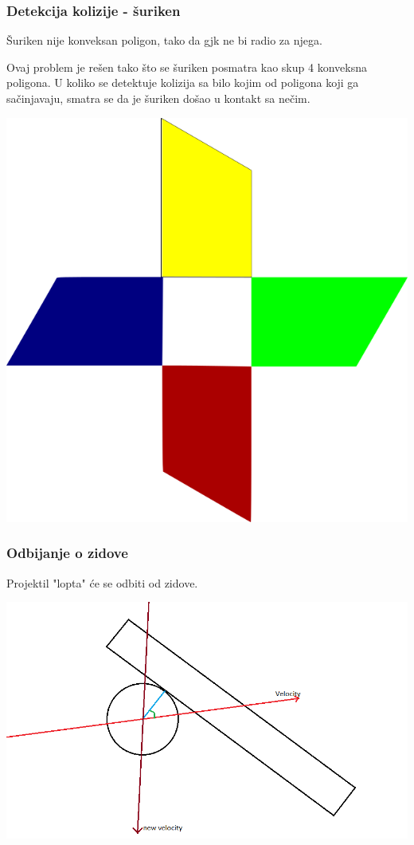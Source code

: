 \documentclass{beamer}
\begin{document}
\begin{frame}
	\frametitle{Detekcija kolizije - šuriken}
	Šuriken nije konveksan poligon, tako da gjk ne bi radio za njega.

	Ovaj problem je rešen tako što se šuriken posmatra kao skup 4 konveksna poligona. U koliko se detektuje kolizija sa bilo kojim od poligona koji ga sačinjavaju, smatra se da je šuriken došao u kontakt sa nečim.
	
	\vspace{0.4cm}
	\begin{center}
		\includegraphics[scale=0.3]{./images/shuriken.png}
	\end{center}
\end{frame}

\begin{frame}
	\frametitle{Odbijanje o zidove}
	Projektil "lopta" će se odbiti od zidove.
	
	\includegraphics[scale=0.34]{./images/odbijanje1.png}
\end{frame}
\end{document}
